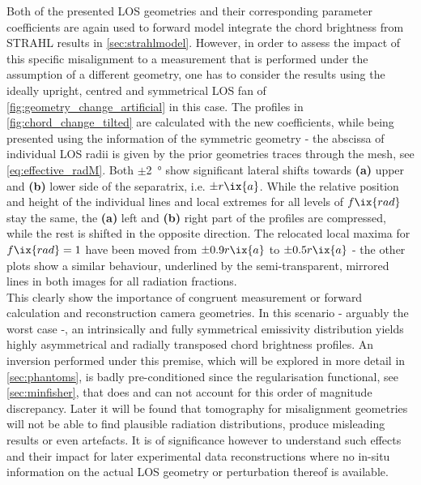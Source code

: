             Both of the presented LOS geometries and their corresponding parameter coefficients are again used to forward model integrate the chord brightness from STRAHL results in \cref{sec:strahlmodel}. However, in order to assess the impact of this specific misalignment to a measurement that is performed under the assumption of a different geometry, one has to consider the results using the ideally upright, centred and symmetrical LOS fan of \cref{fig:geometry_change_artificial} in this case. The profiles in \cref{fig:chord_change_tilted} are calculated with the new coefficients, while being presented using the information of the symmetric geometry - the abscissa of individual LOS radii is given by the prior geometries traces through the mesh, see \cref{eq:effective_radM}. Both $\pm$\SI{2}{\degree} show significant lateral shifts towards \textbf{(a)} upper and \textbf{(b)} lower side of the separatrix, i.e. $\pm r\ix{a}$. While the relative position and height of the individual lines and local extremes for all levels of $f\ix{rad}$ stay the same, the \textbf{(a)} left and \textbf{(b)} right part of the profiles are compressed, while the rest is shifted in the opposite direction. The relocated local maxima for $f\ix{rad}=1$ have been moved from $\pm0.9r\ix{a}$ to $\pm0.5r\ix{a}$ - the other plots show a similar behaviour, underlined by the semi-transparent, mirrored lines in both images for all radiation fractions.\\%
            This clearly show the importance of congruent measurement or forward calculation and reconstruction camera geometries. In this scenario - arguably the worst case -, an intrinsically and fully symmetrical emissivity distribution yields highly asymmetrical and radially transposed chord brightness profiles. An inversion performed under this premise, which will be explored in more detail in \cref{sec:phantoms}, is badly pre-conditioned since the regularisation functional, see \cref{sec:minfisher}, that does and can not account for this order of magnitude discrepancy. Later it will be found that tomography for misalignment geometries will not be able to find plausible radiation distributions, produce misleading results or even artefacts. It is of significance however to understand such effects and their impact for later experimental data reconstructions where no in-situ information on the actual LOS geometry or perturbation thereof is available.%
%
